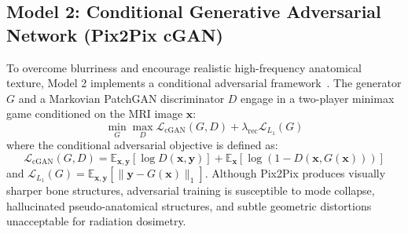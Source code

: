 \subsection{Model 2: Conditional Generative Adversarial Network (Pix2Pix cGAN)}
To overcome blurriness and encourage realistic high-frequency anatomical texture, Model 2 implements a conditional adversarial framework~\cite{isola2017image,nie2017medical}. The generator $G$ and a Markovian PatchGAN discriminator $D$ engage in a two-player minimax game conditioned on the MRI image $\mathbf{x}$:
\begin{equation}
\min_G \max_D \mathcal{L}_{\text{cGAN}}(G, D) + \lambda_{\text{rec}} \mathcal{L}_{L_1}(G)
\label{eq:m2_cgan}
\end{equation}
where the conditional adversarial objective is defined as:
\begin{equation}
\mathcal{L}_{\text{cGAN}}(G, D) = \mathbb{E}_{\mathbf{x}, \mathbf{y}} \left[ \log D(\mathbf{x}, \mathbf{y}) \right] + \mathbb{E}_{\mathbf{x}} \left[ \log \left( 1 - D(\mathbf{x}, G(\mathbf{x})) \right) \right]
\label{eq:m2_adv_loss}
\end{equation}
and $\mathcal{L}_{L_1}(G) = \mathbb{E}_{\mathbf{x}, \mathbf{y}} \left[ \|\mathbf{y} - G(\mathbf{x})\|_1 \right]$. Although Pix2Pix produces visually sharper bone structures, adversarial training is susceptible to mode collapse, hallucinated pseudo-anatomical structures, and subtle geometric distortions unacceptable for radiation dosimetry.

